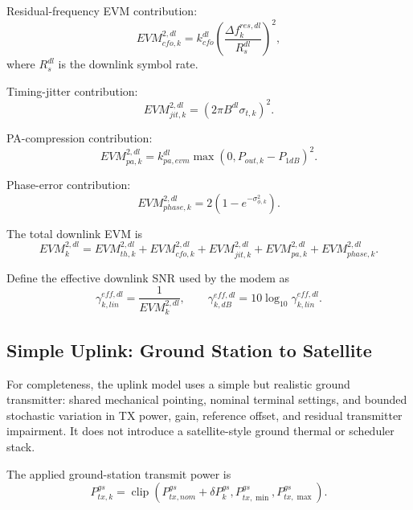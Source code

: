 \documentclass[11pt]{article}
\newcommand{\clip}{\operatorname{clip}}
\begin{document}
Residual-frequency EVM contribution:
\begin{equation}
  EVM^{2,dl}_{cfo,k}
  =
  k^{dl}_{cfo}
  \left(\frac{\Delta f^{res,dl}_k}{R^{dl}_s}\right)^2,
\end{equation}
where $R^{dl}_s$ is the downlink symbol rate.

Timing-jitter contribution:
\begin{equation}
  EVM^{2,dl}_{jit,k} = \left( 2\pi B^{dl} \sigma_{t,k} \right)^2.
\end{equation}

PA-compression contribution:
\begin{equation}
  EVM^{2,dl}_{pa,k}
  =
  k^{dl}_{pa,evm}\max(0, P_{out,k} - P_{1dB})^2.
\end{equation}

Phase-error contribution:
\begin{equation}
  EVM^{2,dl}_{phase,k}
  =
  2\left(1 - e^{-\sigma_{\phi,k}^2}\right).
\end{equation}

The total downlink EVM is
\begin{equation}
  EVM^{2,dl}_k
  =
  EVM^{2,dl}_{th,k}
  + EVM^{2,dl}_{cfo,k}
  + EVM^{2,dl}_{jit,k}
  + EVM^{2,dl}_{pa,k}
  + EVM^{2,dl}_{phase,k}.
\end{equation}

Define the effective downlink SNR used by the modem as
\begin{equation}
  \gamma^{eff,dl}_{k,lin} = \frac{1}{EVM^{2,dl}_k},
  \qquad
  \gamma^{eff,dl}_{k,dB} = 10\log_{10}\gamma^{eff,dl}_{k,lin}.
\end{equation}

\subsection{Simple Uplink: Ground Station to Satellite}

For completeness, the uplink model uses a simple but realistic ground transmitter:
shared mechanical pointing, nominal terminal settings, and bounded stochastic variation
in TX power, gain, reference offset, and residual transmitter impairment. It does not
introduce a satellite-style ground thermal or scheduler stack.

The applied ground-station transmit power is
\begin{equation}
  P^{gs}_{tx,k}
  =
  \clip(P^{gs}_{tx,nom} + \delta P^{gs}_k, P^{gs}_{tx,\min}, P^{gs}_{tx,\max}).
\end{equation}
\end{document}
